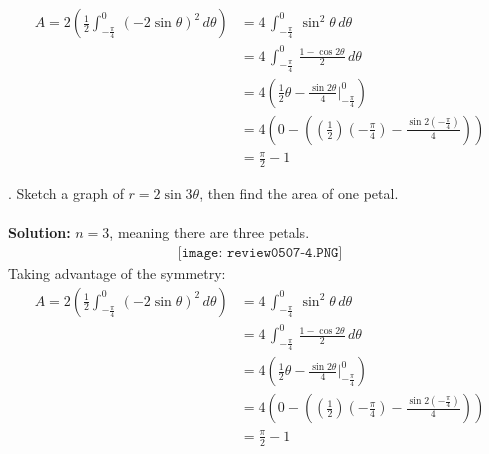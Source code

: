 \documentclass{article}
\begin{document}
\begin{align*}
    A = 2\left(\frac{1}{2} \int_{-\frac{\pi}{4}}^{0}\,(-2\sin\theta)^2\,d\theta\right) &= 4\, \int_{-\frac{\pi}{4}}^{0}\,\sin^2\theta\,d\theta \\
    &= 4\, \int_{-\frac{\pi}{4}}^{0}\, \frac{1-\cos2\theta}{2} \,d\theta \\
    &= 4 \left(\frac{1}{2}\theta - \frac{\sin2\theta}{4} \Bigg|^{0}_{-\frac{\pi}{4}}\right) \\
    &= 4\left(0 - ((\frac{1}{2})(-\frac{\pi}{4})-\frac{\sin2(-\frac{\pi}{4})}{4})\right) \\
    &= \frac{\pi}{2} - 1
\end{align*}

. Sketch a graph of $r = 2\sin3\theta$, then find the area of one petal.
\\\\
\textbf{Solution:}
$n=3$, meaning there are three petals.
\begin{align*}\texttt{[image: review0507-4.PNG]}\end{align*}
Taking advantage of the symmetry:
\begin{align*}
    A = 2\left(\frac{1}{2} \int_{-\frac{\pi}{4}}^{0}\,(-2\sin\theta)^2\,d\theta\right) &= 4\, \int_{-\frac{\pi}{4}}^{0}\,\sin^2\theta\,d\theta \\
    &= 4\, \int_{-\frac{\pi}{4}}^{0}\, \frac{1-\cos2\theta}{2} \,d\theta \\
    &= 4 \left(\frac{1}{2}\theta - \frac{\sin2\theta}{4} \Bigg|^{0}_{-\frac{\pi}{4}}\right) \\
    &= 4\left(0 - ((\frac{1}{2})(-\frac{\pi}{4})-\frac{\sin2(-\frac{\pi}{4})}{4})\right) \\
    &= \frac{\pi}{2} - 1
\end{align*}
\end{document}
